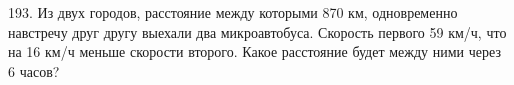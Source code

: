 193. Из двух городов, расстояние между которыми  870 км, одновременно навстречу друг другу выехали два микроавтобуса. Скорость первого 59 км/ч, что на 16 км/ч меньше скорости второго. Какое расстояние будет между ними через 6 часов?\\
